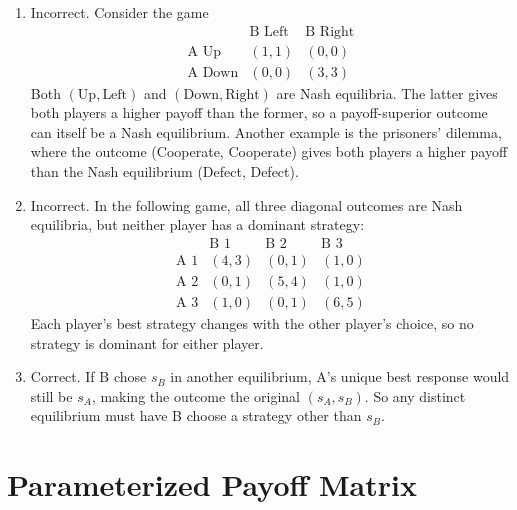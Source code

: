 \documentclass{assignment}
\begin{document}
\begin{solution}
    \begin{enumerate}
        \item[(a)] Incorrect. Consider the game
              \[
                  \begin{array}{c|cc}
                                    & \text{B Left} & \text{B Right} \\ \hline
                      \text{A Up}   & (1,1)         & (0,0)          \\
                      \text{A Down} & (0,0)         & (3,3)
                  \end{array}
              \]
              Both \((\text{Up},\text{Left})\) and \((\text{Down},\text{Right})\)
              are Nash equilibria. The latter gives both players a higher payoff than
              the former, so a payoff-superior outcome can itself be a Nash equilibrium. Another example is the prisoners' dilemma, where the outcome (Cooperate, Cooperate) gives both players a higher payoff than the Nash equilibrium (Defect, Defect).
        \item[(b)] Incorrect. In the following game, all three diagonal outcomes
              are Nash equilibria, but neither player has a dominant strategy:
              \[
                  \begin{array}{c|ccc}
                                 & \text{B 1} & \text{B 2} & \text{B 3} \\ \hline
                      \text{A 1} & (4,3)      & (0,1)      & (1,0)      \\
                      \text{A 2} & (0,1)      & (5,4)      & (1,0)      \\
                      \text{A 3} & (1,0)      & (0,1)      & (6,5)
                  \end{array}
              \]
              Each player's best strategy changes with the other player's choice, so
              no strategy is dominant for either player.
        \item[(c)] Correct. If B chose \(s_B\) in another equilibrium, A's
              unique best response would still be \(s_A\), making the outcome the
              original \((s_A,s_B)\). So any distinct equilibrium must have B
              choose a strategy other than \(s_B\).
    \end{enumerate}
\end{solution}

\section{Parameterized Payoff Matrix}
\end{document}
